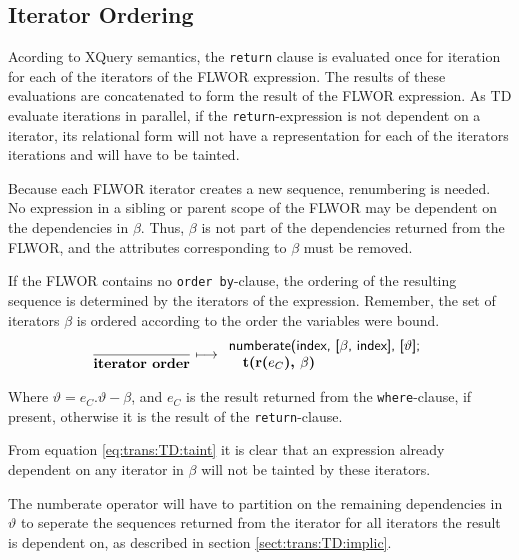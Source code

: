 \subsection{Iterator Ordering}
Acording to XQuery semantics, the \texttt{return} clause is evaluated once for iteration for each of the iterators
of the FLWOR expression. The results of these evaluations are concatenated to form the result of the FLWOR
expression. As TD evaluate iterations in parallel, if the \texttt{return}-expression is not dependent on a
iterator, its relational form will not have a representation for each of the iterators iterations and will have to be tainted.

Because each FLWOR iterator creates a new sequence, renumbering is needed. No expression in a sibling or parent
scope of the FLWOR may be dependent on the dependencies in $\beta$. Thus, $\beta$ is not part of the dependencies
returned from the FLWOR, and the attributes corresponding to $\beta$ must be removed. 

If the FLWOR contains no \texttt{order by}-clause, the ordering of the resulting sequence is determined by the
iterators of the expression. Remember, the set of iterators $\beta$ is ordered according to the order the
variables were bound.
\begin{equation}
\frac{}{\mbox{\textbf{iterator order}}}
\longmapsto
\begin{array}{l}
\mbox{\textsf{numberate(index, [}}\beta\mbox{\textsf{, index], [}}\vartheta\mbox{\textsf{];}} \\ \quad
\mbox{\textbf{t(r(}}e_{C}\mbox{\textbf{), }}\beta\mbox{\textbf{)}}
\end{array}
\label{rule:trans:TD:itOrd}
\end{equation}

Where $\vartheta = e_{C}.\vartheta - \beta$, and $e_C$ is the result returned from the \texttt{where}-clause, if
present, otherwise it is the result of the \texttt{return}-clause.

From equation \ref{eq:trans:TD:taint} it is clear that an expression already dependent on any iterator in $\beta$
will not be tainted by these iterators.

The \textsf{numberate} operator will have to partition on the remaining dependencies in $\vartheta$ to seperate
the sequences returned from the iterator for all iterators the result is dependent on, as described in section
\ref{sect:trans:TD:implic}.

